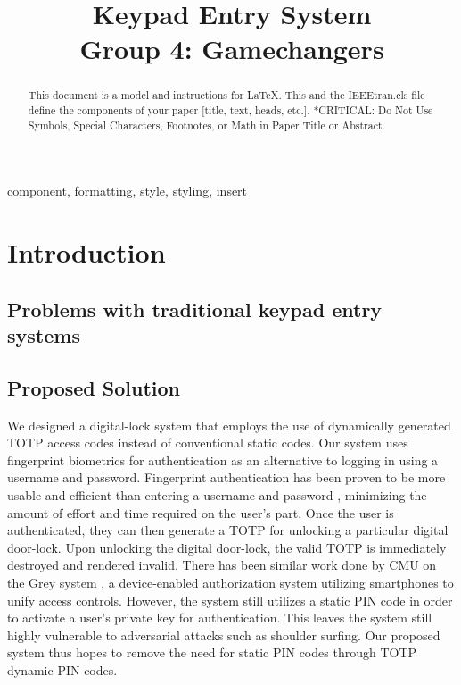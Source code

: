\documentclass[conference]{IEEEtran}
\begin{document}
\title{Keypad Entry System\\
Group 4: Gamechangers
}

\author{
\and
{}
\and
{}
\and
{}
}

\maketitle

\begin{abstract}
This document is a model and instructions for \LaTeX.
This and the IEEEtran.cls file define the components of your paper [title, text, heads, etc.]. *CRITICAL: Do Not Use Symbols, Special Characters, Footnotes, 
or Math in Paper Title or Abstract.
\end{abstract}

\begin{IEEEkeywords}
component, formatting, style, styling, insert
\end{IEEEkeywords}

\section{Introduction}
\subsection{Problems with traditional keypad entry systems}

\subsection{Proposed Solution}
	We designed a digital-lock system that employs the use of dynamically generated TOTP access codes instead of conventional static codes. Our system uses fingerprint biometrics for authentication as an alternative to logging in using a username and password. Fingerprint authentication has been proven to be more usable and efficient than entering a username and password \cite{b2}, minimizing the amount of effort and time required on the user’s part. Once the user is authenticated, they can then generate a TOTP for unlocking a particular digital door-lock. Upon unlocking the digital door-lock, the valid TOTP is immediately destroyed and rendered invalid. 
	There has been similar work done by CMU on the Grey system \cite{b3}, a device-enabled authorization system utilizing smartphones to unify access controls. However, the system still utilizes a static PIN code in order to activate a user’s private key for authentication. This leaves the system still highly vulnerable to adversarial attacks such as shoulder surfing. Our proposed system thus hopes to remove the need for static PIN codes through TOTP dynamic PIN codes. 
\end{document}
